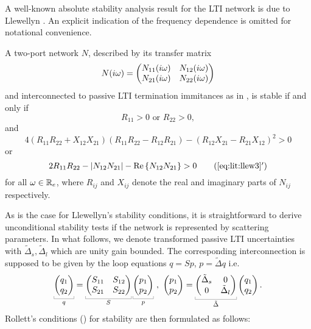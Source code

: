 A well-known absolute stability analysis result for the LTI network is due to Llewellyn \cite{llewellyn}. 
An explicit indication of the frequency dependence is omitted for notational convenience.
\begin{thm}\label{thm:apdx:llw}
A two-port network $N$,  described by its transfer matrix
\[
N(i\omega) = \begin{pmatrix}N_{11}(i\omega) &N_{12}(i\omega)\\N_{21}(i\omega) &N_{22}(i\omega)\end{pmatrix}
\]
and interconnected to passive LTI termination immitances as in , is stable if and only if
\begin{equation}R_{11} > 0\text{ or } R_{22} > 0,\label{eq:lit:llew2}\end{equation} and
\begin{equation}4\left(R_{11}R_{22}+X_{12}X_{21}\right)\left(R_{11}R_{22}-R_{12}R_{21}\right)-\left(R_{12}X_{21}-R_{21}X_{12}\right)^2 > 0\label{eq:lit:llew3}\end{equation} 
or
\begin{equation}2R_{11}R_{22}-\abs{N_{12}N_{21}}-\Re{N_{12}N_{21}} > 0\tag{\ref{eq:lit:llew3}$'$}\end{equation}%
for all $\omega\in\mathbb{R}_e$, where $R_{ij}$ and $X_{ij}$ denote the real and imaginary parts of $N_{ij}$ respectively.
\end{thm}

As is the case for Llewellyn's stability conditions, it is straightforward to derive 
unconditional stability {tests if} the network is represented by scattering parameters. 
In what follows, we denote transformed passive LTI uncertainties with $\tilde{\Delta}_{s}, 
\tilde{\Delta}_l$ which are unity gain bounded. The corresponding interconnection is 
supposed to be given by the loop equations
$q = S p$, $p=\tilde{\Delta} q$ i.e.
\begin{equation}
\underbracket[0.2pt]{\pmatr{q_1\\q_2}}_{q}=
\underbracket[0.2pt]{\pmatr{S_{11} &S_{12}\\S_{21} &S_{22}}}_{S}
\underbracket[0.2pt]{\pmatr{p_1\\p_2}}_{p} \ , \ \pmatr{p_1\\p_2}=
\underbracket[0.2pt]{\pmatr{\tilde{\Delta}_s&0\\0&\tilde{\Delta}_l}}_{\tilde{\Delta}} \pmatr{q_1\\q_2}.
\label{eq:rolic}
\end{equation}
Rollett's conditions (\cite{stern,rollett,kurokawa}) for stability are then
formulated as follows: 

